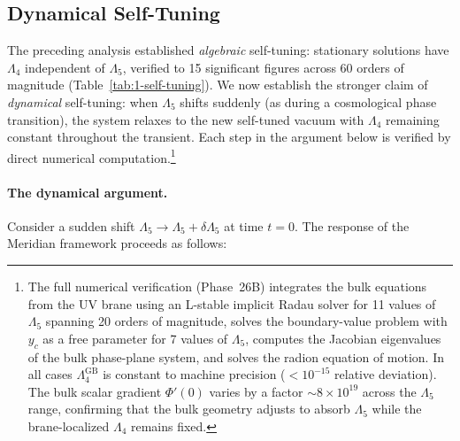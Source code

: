 \subsection{Dynamical Self-Tuning}
\label{sec:1-dynamical-self-tuning}

The preceding analysis established \emph{algebraic} self-tuning: stationary solutions have $\Lambda_4$ independent of $\Lambda_5$, verified to 15 significant figures across 60 orders of magnitude (Table~\ref{tab:1-self-tuning}). We now establish the stronger claim of \emph{dynamical} self-tuning: when $\Lambda_5$ shifts suddenly (as during a cosmological phase transition), the system relaxes to the new self-tuned vacuum with $\Lambda_4$ remaining constant throughout the transient. Each step in the argument below is verified by direct numerical computation.\footnote{The full numerical verification (Phase~26B) integrates the bulk equations from the UV brane using an L-stable implicit Radau solver for 11 values of $\Lambda_5$ spanning 20 orders of magnitude, solves the boundary-value problem with $y_c$ as a free parameter for 7 values of $\Lambda_5$, computes the Jacobian eigenvalues of the bulk phase-plane system, and solves the radion equation of motion. In all cases $\Lambda_4^{\mathrm{GB}}$ is constant to machine precision ($< 10^{-15}$ relative deviation). The bulk scalar gradient $\Phi'(0)$ varies by a factor $\sim 8 \times 10^{19}$ across the $\Lambda_5$ range, confirming that the bulk geometry adjusts to absorb $\Lambda_5$ while the brane-localized $\Lambda_4$ remains fixed.}

\paragraph{The dynamical argument.} Consider a sudden shift $\Lambda_5 \to \Lambda_5 + \delta\Lambda_5$ at time $t = 0$. The response of the Meridian framework proceeds as follows:

